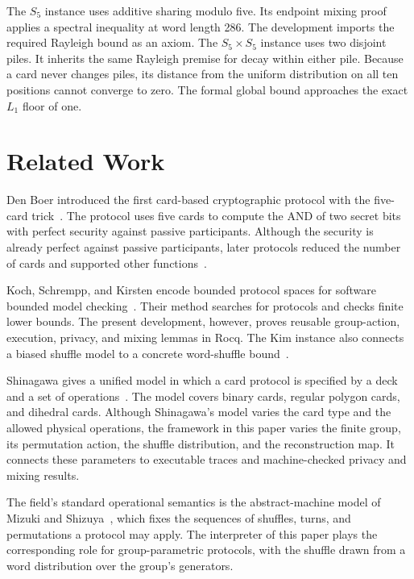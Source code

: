 \documentclass[runningheads]{llncs}
\newcommand{\Rocq}{Rocq}
\begin{document}
The $S_5$ instance uses additive sharing modulo five. Its endpoint mixing
proof applies a spectral inequality at word length 286. The development
imports the required Rayleigh bound as an axiom. The $S_5\times S_5$ instance
uses two disjoint piles. It inherits the same Rayleigh premise for decay
within either pile. Because a card never changes piles, its distance from the uniform
distribution on all ten positions cannot converge to zero. The formal global
bound approaches the exact $L_1$ floor of one.

\section{Related Work}\label{sec:related}

Den Boer introduced the first card-based cryptographic protocol with the
five-card trick~\cite{denBoer1989,KochFUN2021}. The protocol uses five cards
to compute the AND of two secret bits with perfect security against passive
participants. Although the security is already perfect against passive participants,
later protocols reduced the number of cards and supported other
functions~\cite{MizukiSone2009,MizukiSone2012,KochWalzerHartel2015}.

Koch, Schrempp, and Kirsten encode bounded protocol spaces for software
bounded model checking~\cite{Koch2019}. Their method searches for protocols
and checks finite lower bounds. The present development, however, proves reusable group-action,
execution, privacy, and mixing lemmas in \Rocq{}. The Kim
instance also connects a biased shuffle model to a concrete word-shuffle
bound~\cite{KimCetinkaya2025}.

Shinagawa gives a unified model in which a card protocol is specified by a
deck and a set of operations~\cite{Shinagawa2021}. The model covers binary
cards, regular polygon cards, and dihedral cards. Although Shinagawa's model varies the card type and the allowed physical
operations, the framework in this paper varies the finite group, its
permutation action, the shuffle distribution, and the reconstruction
map. It connects these parameters to executable
traces and machine-checked privacy and mixing results.

The field's standard operational semantics is the abstract-machine model
of Mizuki and Shizuya~\cite{MizukiShizuya2014}, which fixes the sequences
of shuffles, turns, and permutations a protocol may apply. The interpreter
of this paper plays the corresponding role for group-parametric protocols,
with the shuffle drawn from a word distribution over the group's
generators.
\end{document}
